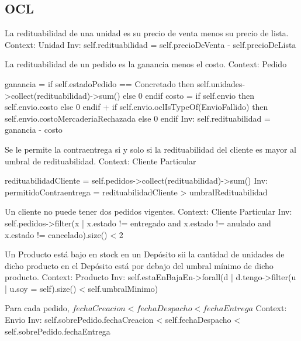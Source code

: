 \subsection{OCL}

\begin{listocl}
  \begin{itemocl}{La redituabilidad de una unidad es su precio de venta menos su precio de lista.}
Context: Unidad
Inv: self.redituabilidad = self.precioDeVenta - self.precioDeLista
  \end{itemocl}

  \begin{itemocl}{La redituabilidad de un pedido es la ganancia menos el costo.}
Context: Pedido

ganancia = if self.estadoPedido == Concretado
	   then self.unidades->collect(redituabilidad)->sum()
	   else 0
	   endif
costo = if self.envio
	then self.envio.costo
	else 0
	endif
	+ if self.envio.oclIsTypeOf(EnvioFallido)
	then self.envio.costoMercaderiaRechazada
	else 0
	endif
Inv: self.redituabilidad = ganancia - costo
  \end{itemocl}

  \begin{itemocl}{Se le permite la contraentrega si y solo si la redituabilidad del cliente es mayor al umbral de redituabilidad.}
Context: Cliente Particular

redituabilidadCliente = self.pedidos->collect(redituabilidad)->sum()
Inv: permitidoContraentrega = redituabilidadCliente > umbralRedituabilidad
  \end{itemocl}

  \begin{itemocl}{Un cliente no puede tener dos pedidos vigentes.}
Context: Cliente Particular
Inv: self.pedidos->filter(x | x.estado != entregado and x.estado != anulado and x.estado != cancelado).size() < 2
  \end{itemocl}

  \begin{itemocl}{Un Producto está bajo en stock en un Depósito sii la cantidad de unidades de dicho producto en el Depósito está por debajo del umbral mínimo de dicho producto.}
Context: Producto
Inv: self.estaEnBajaEn->forall(d | d.tengo->filter(u | u.soy = self).size() < self.umbralMinimo)
  \end{itemocl}

  \begin{itemocl}{Para cada pedido, $fechaCreacion < fechaDespacho < fechaEntrega$}
Context: Envio
Inv: self.sobrePedido.fechaCreacion < self.fechaDespacho < self.sobrePedido.fechaEntrega
  \end{itemocl}


\end{listocl}

